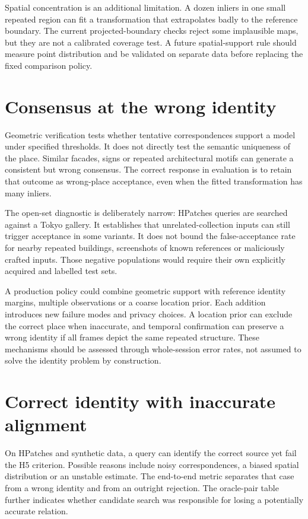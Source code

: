 Spatial concentration is an additional limitation. A dozen inliers in one small repeated region can fit a transformation that extrapolates badly to the reference boundary. The current projected-boundary checks reject some implausible maps, but they are not a calibrated coverage test. A future spatial-support rule should measure point distribution and be validated on separate data before replacing the fixed comparison policy.

\section{Consensus at the wrong identity}
Geometric verification tests whether tentative correspondences support a model under specified thresholds. It does not directly test the semantic uniqueness of the place. Similar facades, signs or repeated architectural motifs can generate a consistent but wrong consensus. The correct response in evaluation is to retain that outcome as wrong-place acceptance, even when the fitted transformation has many inliers.

The open-set diagnostic is deliberately narrow: HPatches queries are searched against a Tokyo gallery. It establishes that unrelated-collection inputs can still trigger acceptance in some variants. It does not bound the false-acceptance rate for nearby repeated buildings, screenshots of known references or maliciously crafted inputs. Those negative populations would require their own explicitly acquired and labelled test sets.

A production policy could combine geometric support with reference identity margins, multiple observations or a coarse location prior. Each addition introduces new failure modes and privacy choices. A location prior can exclude the correct place when inaccurate, and temporal confirmation can preserve a wrong identity if all frames depict the same repeated structure. These mechanisms should be assessed through whole-session error rates, not assumed to solve the identity problem by construction.

\section{Correct identity with inaccurate alignment}
On HPatches and synthetic data, a query can identify the correct source yet fail the H5 criterion. Possible reasons include noisy correspondences, a biased spatial distribution or an unstable estimate. The end-to-end metric separates that case from a wrong identity and from an outright rejection. The oracle-pair table further indicates whether candidate search was responsible for losing a potentially accurate relation.

